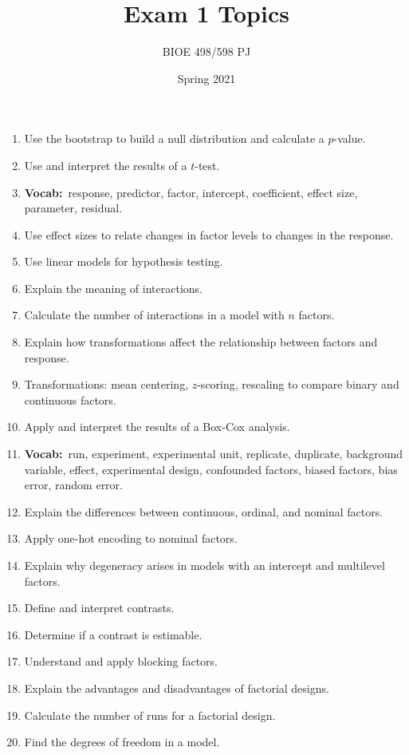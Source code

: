 \documentclass[pal,wide]{pajarticle}
\title{Exam 1 Topics}
\author{BIOE 498/598 PJ}
\date{Spring 2021}
\begin{document}
\maketitle

\newcommand\Vocab{\textbf{Vocab:}}

\begin{enumerate}
	\item Use the bootstrap to build a null distribution and calculate a $p$-value.
	\item Use and interpret the results of a $t$-test.
	\item \Vocab\ response, predictor, factor, intercept, coefficient, effect size, parameter, residual.
	\item Use effect sizes to relate changes in factor levels to changes in the response.
	\item Use linear models for hypothesis testing.
	\item Explain the meaning of interactions.
	\item Calculate the number of interactions in a model with $n$ factors.
	\item Explain how transformations affect the relationship between factors and response.
	\item Transformations: mean centering, $z$-scoring, rescaling to compare binary and continuous factors.
	\item Apply and interpret the results of a Box-Cox analysis.
	\item \Vocab\ run, experiment, experimental unit, replicate, duplicate, background variable, effect, experimental design, confounded factors, biased factors, bias error, random error.
	\item Explain the differences between continuous, ordinal, and nominal factors.
	\item Apply one-hot encoding to nominal factors.
	\item Explain why degeneracy arises in models with an intercept and multilevel factors.
	\item Define and interpret contrasts.
	\item Determine if a contrast is estimable.
	\item Understand and apply blocking factors.
	\item Explain the advantages and disadvantages of factorial designs.
	\item Calculate the number of runs for a factorial design.
	\item Find the degrees of freedom in a model.

\end{enumerate}
\end{document}
